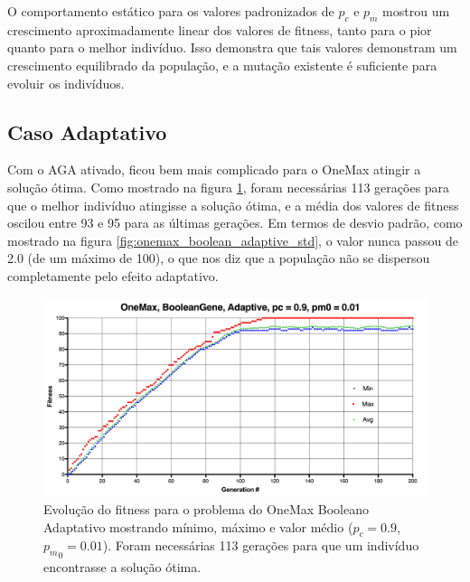 O comportamento estático para os valores padronizados de $p_c$ e $p_m$ mostrou um crescimento aproximadamente linear dos valores de fitness, tanto para o pior quanto para o melhor indivíduo. Isso demonstra que tais valores demonstram um crescimento equilibrado da população, e a mutação existente é suficiente para evoluir os indivíduos.

\subsection{Caso Adaptativo}

Com o AGA ativado, ficou bem mais complicado para o OneMax atingir a solução ótima. Como mostrado na figura \ref{fig:onemax_boolean_adaptive}, foram necessárias 113 gerações para que o melhor indivíduo atingisse a solução ótima, e a média dos valores de fitness oscilou entre 93 e 95 para as últimas gerações. Em termos de desvio padrão, como mostrado na figura \ref{fig:onemax_boolean_adaptive_std}, o valor nunca passou de 2.0 (de um máximo de 100), o que nos diz que a população não se dispersou completamente pelo efeito adaptativo.

\begin{figure}[ht!]
    \centering \includegraphics[width=1.0\textwidth]{onemax_boolean_adaptive.jpg}
    \caption{Evolução do fitness para o problema do OneMax Booleano Adaptativo mostrando mínimo, máximo e valor médio ($p_c=0.9$, ${p_m}_0=0.01$). Foram necessárias 113 gerações para que um indivíduo encontrasse a solução ótima.}
    \label{fig:onemax_boolean_adaptive}
\end{figure}

